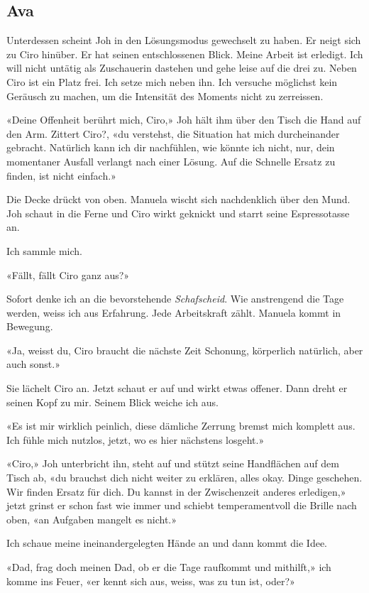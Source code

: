 \subsection{Ava}

Unterdessen scheint Joh in den Lösungsmodus gewechselt zu haben. Er
neigt sich zu Ciro hinüber. Er hat seinen entschlossenen Blick. Meine Arbeit ist erledigt. Ich will nicht untätig als Zuschauerin dastehen und gehe leise auf die drei zu. Neben Ciro ist ein Platz frei. Ich setze mich neben ihn. Ich versuche möglichst kein Geräusch zu machen, um die Intensität des Moments nicht zu zerreissen.

«Deine Offenheit berührt mich, Ciro,» Joh hält ihm über
den Tisch die Hand auf den Arm. Zittert Ciro?, «du verstehst, die
Situation hat mich durcheinander gebracht. Natürlich kann ich dir nachfühlen,
wie könnte ich nicht, nur, dein momentaner Ausfall verlangt nach einer
Lösung. Auf die Schnelle Ersatz zu finden, ist nicht einfach.»

Die Decke drückt von oben. Manuela wischt sich nachdenklich über den
Mund. Joh schaut in die Ferne und Ciro wirkt geknickt und starrt 
seine Espressotasse an.

Ich sammle mich.

«Fällt, fällt Ciro ganz aus?»

Sofort denke ich an die bevorstehende \emph{Schafscheid}. Wie
anstrengend die Tage werden, weiss ich aus Erfahrung. Jede Arbeitskraft
zählt. Manuela kommt in Bewegung.

«Ja, weisst du, Ciro braucht die nächste Zeit Schonung, körperlich
natürlich, aber auch sonst.»

Sie lächelt Ciro an. Jetzt schaut er auf und wirkt etwas offener. Dann
dreht er seinen Kopf zu mir. Seinem Blick weiche ich aus.

«Es ist mir wirklich peinlich, diese dämliche Zerrung bremst mich
komplett aus. Ich fühle mich nutzlos, jetzt, wo es hier nächstens
losgeht.»

«Ciro,» Joh unterbricht ihn, steht auf und stützt seine Handflächen auf
dem Tisch ab, «du brauchst dich nicht weiter zu erklären, alles okay.
Dinge geschehen. Wir finden Ersatz für dich. Du kannst in der
Zwischenzeit anderes erledigen,» jetzt grinst er schon fast wie immer
und schiebt temperamentvoll die Brille nach oben, «an Aufgaben mangelt
es nicht.»

Ich schaue meine ineinandergelegten Hände an und dann kommt die Idee.

«Dad, frag doch meinen Dad, ob er die Tage raufkommt und mithilft,» ich
komme ins Feuer, «er kennt sich aus, weiss, was zu tun ist, oder?»


